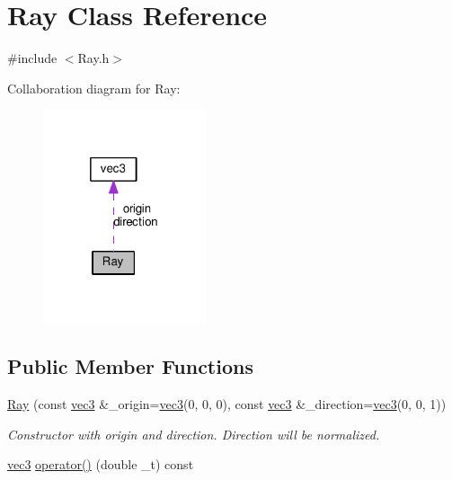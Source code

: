 \hypertarget{classRay}{}\section{Ray Class Reference}
\label{classRay}


{\ttfamily \#include $<$Ray.\+h$>$}



Collaboration diagram for Ray\+:
\nopagebreak
\begin{figure}[H]
\begin{center}
\leavevmode
\includegraphics[width=136pt]{classRay__coll__graph}
\end{center}
\end{figure}
\subsection*{Public Member Functions}
\begin{DoxyCompactItemize}
\item 
\hyperlink{classRay_a773588948dfa8469c81f43907f6a7c63}{Ray} (const \hyperlink{classvec3}{vec3} \&\+\_\+origin=\hyperlink{classvec3}{vec3}(0, 0, 0), const \hyperlink{classvec3}{vec3} \&\+\_\+direction=\hyperlink{classvec3}{vec3}(0, 0, 1))
\begin{DoxyCompactList}\small\item\em Constructor with origin and direction. Direction will be normalized. \end{DoxyCompactList}\item 
\hyperlink{classvec3}{vec3} \hyperlink{classRay_adcb42927ac5d583e1296d2ec4e5b8b1a}{operator()} (double \+\_\+t) const 
\end{DoxyCompactItemize}
